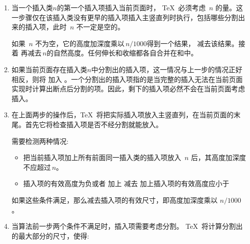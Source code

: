 \documentclass{book}
\begin{document}
\begin{enumerate}
\item 当一个插入类$n$的第一个插入项插入当前页面时， \TeX\  必须考虑 $\,n$ 的量。这一步骤仅在该插入类没有更早的插入项插入主竖直列时执行，包括哪些分割出来的插入项，此时 $\,n$ 不一定是空的。

    如果 $\,n$ 不为空，它的高度加深度乘以$\,n/1000$得到一个结果，
     减去该结果。接着  再减去$\,n$的自然高度。任何伸长和收缩都各自合并在和中。

\item 如果当前页面存在插入类$n$中分割出的插入项，这一情况与上一步的情况正好相反，则将
 加入 。一个分割出的插入项指的是当完整的插入无法在当前页面实现时计算出断点后分割的项。因此，剩下的插入项必然不会在当前页面考虑插入。


\item 在上面两步的操作后，\TeX\  将把实际插入项放入主竖直列，在当前页面的末尾。首先它将检查插入项是否不经分割就能放入。

需要检测两种情况:
\begin{itemize}

\item 把当前插入项加上所有前面同一插入类的插入项放入 $\,n$ 后，其高度加深度不应超过$\,n$。


  \item 插入项的有效高度为负或者 加上  减去
   加上插入项的有效高度应小于 

\end{itemize}
  如果这些条件满足，那么减去插入项的有效尺寸，即高度加深度乘以
  $n/1000$。


%
%
\item 当算法前一步两个条件不满足时，插入项需要考虑分割。 \TeX\ 将计算分割出的最大部分的尺寸，使得:



\end{enumerate}
\end{document}
